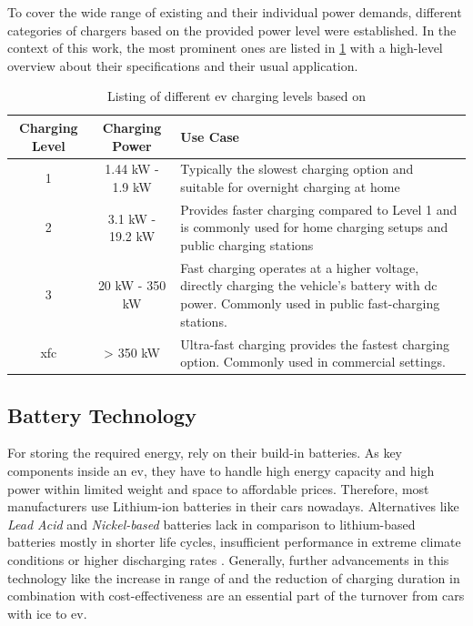 \noindent To cover the wide range of existing  and their individual power demands, different categories of chargers based on the provided power level were established. In the context of this work, the most prominent ones are listed in \ref{tab:ev-charging-levels} with a high-level overview about their specifications and their usual application. 

\begingroup
\setlength{\tabcolsep}{10pt} %
\renewcommand{\arraystretch}{1.5} %
\begin{table}[!ht]
    \centering
    \caption{Listing of different \acrshort{ev} charging levels based on \cite{acharige_review_2023}}
    \begin{tabular}{c|c|m{6.5cm}}
        Charging Level & Charging Power & Use Case \\ \hline
         1 & 1.44 \acrshort{kW} - 1.9 \acrshort{kW} & Typically the slowest charging option and suitable for overnight charging at home \\
         2 & 3.1 \acrshort{kW} - 19.2 \acrshort{kW} & Provides faster charging compared to Level 1 and is commonly used for home charging setups and public charging stations \\
         3 & 20 \acrshort{kW} - 350 \acrshort{kW} & Fast charging operates at a higher voltage, directly charging the vehicle's battery with \acrshort{dc} power. Commonly used in public fast-charging stations.\\
         \acrshort{xfc} & > 350 \acrshort{kW} & Ultra-fast charging provides the fastest charging option. Commonly used in commercial settings.
    \end{tabular}
    \label{tab:ev-charging-levels}
\end{table}
\endgroup

\newpage

\subsection{Battery Technology}
\label{ch:Fundamentals:sec:Electric Mobility:ssec:Battery Technology}

For storing the required energy,  rely on their build-in batteries. As key components inside an \acrshort{ev}, they have to handle high energy capacity and high power within limited weight and space to affordable prices.
Therefore, most manufacturers use Lithium-ion batteries in their cars nowadays. 
Alternatives like \textit{Lead Acid} and \textit{Nickel-based} batteries lack in comparison to lithium-based batteries mostly in shorter life cycles, insufficient performance in extreme climate conditions or higher discharging rates \cite{acharige_review_2023}.
Generally, further advancements in this technology like the increase in range of  and the reduction of charging duration in combination with cost-effectiveness are an essential part of the turnover from cars with \acrshort{ice} to \acrshort{ev}.

